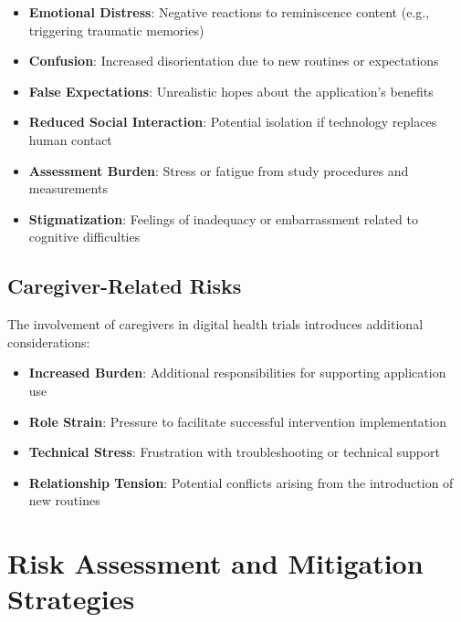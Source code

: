 \begin{itemize}
    \item \textbf{Emotional Distress}: Negative reactions to reminiscence content (e.g., triggering traumatic memories)
    
    \item \textbf{Confusion}: Increased disorientation due to new routines or expectations
    
    \item \textbf{False Expectations}: Unrealistic hopes about the application's benefits
    
    \item \textbf{Reduced Social Interaction}: Potential isolation if technology replaces human contact
    
    \item \textbf{Assessment Burden}: Stress or fatigue from study procedures and measurements
    
    \item \textbf{Stigmatization}: Feelings of inadequacy or embarrassment related to cognitive difficulties
\end{itemize}

\subsection{Caregiver-Related Risks}
The involvement of caregivers in digital health trials introduces additional considerations:

\begin{itemize}
    \item \textbf{Increased Burden}: Additional responsibilities for supporting application use
    
    \item \textbf{Role Strain}: Pressure to facilitate successful intervention implementation
    
    \item \textbf{Technical Stress}: Frustration with troubleshooting or technical support
    
    \item \textbf{Relationship Tension}: Potential conflicts arising from the introduction of new routines
\end{itemize}

\section{Risk Assessment and Mitigation Strategies}
